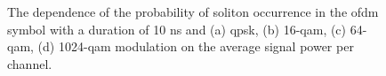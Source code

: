 \begin{figure}[htpb]
\begin{minipage}[h]{0.47\linewidth}
{        }
    \end{minipage}
    \vfill
    \begin{minipage}[h]{0.47\linewidth}
    \end{minipage}
    \hfill
    \begin{minipage}[h]{0.47\linewidth}
    \end{minipage}

    \caption{The dependence of the probability of soliton occurrence in the \acrshort{ofdm} symbol with a duration of 10 ns and (a) \acrshort{qpsk}, (b) 16-\acrshort{qam}, (c) 64-\acrshort{qam}, (d) 1024-\acrshort{qam} modulation on the average signal power per channel.}
    \label{fig:ofdm_result_mod_all}
\end{figure}

